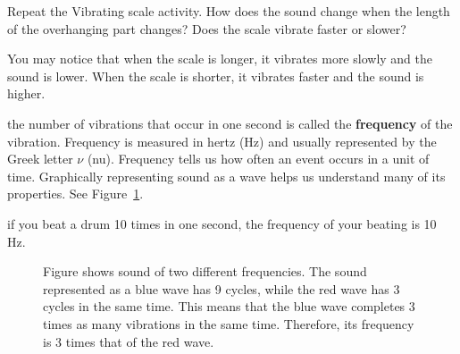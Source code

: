 \documentclass{xtufte-handout}
\newcommand{\hertz}{Hz}
\begin{document}
Repeat the Vibrating scale activity.  How does the sound change when the length of the overhanging part changes? Does the scale vibrate faster or slower?

You may notice that when the scale is longer, it vibrates more slowly and the sound is lower. When the scale is shorter, it vibrates faster and the sound is higher. 

 the number of vibrations that occur in one second is called the \textbf{frequency} of the vibration. Frequency is measured in hertz (\hertz) and usually represented by the Greek letter $\nu$ (nu). Frequency tells us how often an event occurs in a unit of time. Graphically representing sound as a wave helps us understand many of its properties. See Figure~\ref{fig:frequency}.

 if you beat a drum 10 times in one second, the frequency of your beating is 10 \hertz.

\begin{figure}[h]
  \caption{\label{fig:frequency}Figure shows sound of two different frequencies. The sound represented as a blue wave has 9 cycles, while the red wave has 3 cycles in the same time. This means that the blue wave completes 3 times as many vibrations in the same time. Therefore, its frequency is 3 times that of the red wave.}
\end{figure}
\end{document}
